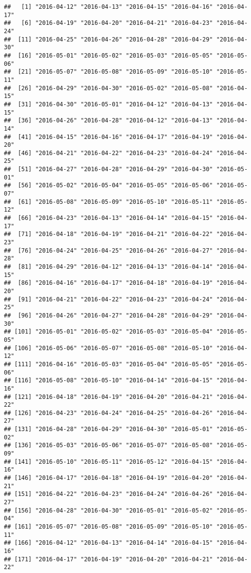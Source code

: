\documentclass[
]{article}
\begin{document}
\begin{verbatim}
##   [1] "2016-04-12" "2016-04-13" "2016-04-15" "2016-04-16" "2016-04-17"
##   [6] "2016-04-19" "2016-04-20" "2016-04-21" "2016-04-23" "2016-04-24"
##  [11] "2016-04-25" "2016-04-26" "2016-04-28" "2016-04-29" "2016-04-30"
##  [16] "2016-05-01" "2016-05-02" "2016-05-03" "2016-05-05" "2016-05-06"
##  [21] "2016-05-07" "2016-05-08" "2016-05-09" "2016-05-10" "2016-05-11"
##  [26] "2016-04-29" "2016-04-30" "2016-05-02" "2016-05-08" "2016-04-15"
##  [31] "2016-04-30" "2016-05-01" "2016-04-12" "2016-04-13" "2016-04-15"
##  [36] "2016-04-26" "2016-04-28" "2016-04-12" "2016-04-13" "2016-04-14"
##  [41] "2016-04-15" "2016-04-16" "2016-04-17" "2016-04-19" "2016-04-20"
##  [46] "2016-04-21" "2016-04-22" "2016-04-23" "2016-04-24" "2016-04-25"
##  [51] "2016-04-27" "2016-04-28" "2016-04-29" "2016-04-30" "2016-05-01"
##  [56] "2016-05-02" "2016-05-04" "2016-05-05" "2016-05-06" "2016-05-07"
##  [61] "2016-05-08" "2016-05-09" "2016-05-10" "2016-05-11" "2016-05-12"
##  [66] "2016-04-23" "2016-04-13" "2016-04-14" "2016-04-15" "2016-04-17"
##  [71] "2016-04-18" "2016-04-19" "2016-04-21" "2016-04-22" "2016-04-23"
##  [76] "2016-04-24" "2016-04-25" "2016-04-26" "2016-04-27" "2016-04-28"
##  [81] "2016-04-29" "2016-04-12" "2016-04-13" "2016-04-14" "2016-04-15"
##  [86] "2016-04-16" "2016-04-17" "2016-04-18" "2016-04-19" "2016-04-20"
##  [91] "2016-04-21" "2016-04-22" "2016-04-23" "2016-04-24" "2016-04-25"
##  [96] "2016-04-26" "2016-04-27" "2016-04-28" "2016-04-29" "2016-04-30"
## [101] "2016-05-01" "2016-05-02" "2016-05-03" "2016-05-04" "2016-05-05"
## [106] "2016-05-06" "2016-05-07" "2016-05-08" "2016-05-10" "2016-04-12"
## [111] "2016-04-16" "2016-05-03" "2016-05-04" "2016-05-05" "2016-05-06"
## [116] "2016-05-08" "2016-05-10" "2016-04-14" "2016-04-15" "2016-04-16"
## [121] "2016-04-18" "2016-04-19" "2016-04-20" "2016-04-21" "2016-04-22"
## [126] "2016-04-23" "2016-04-24" "2016-04-25" "2016-04-26" "2016-04-27"
## [131] "2016-04-28" "2016-04-29" "2016-04-30" "2016-05-01" "2016-05-02"
## [136] "2016-05-03" "2016-05-06" "2016-05-07" "2016-05-08" "2016-05-09"
## [141] "2016-05-10" "2016-05-11" "2016-05-12" "2016-04-15" "2016-04-16"
## [146] "2016-04-17" "2016-04-18" "2016-04-19" "2016-04-20" "2016-04-21"
## [151] "2016-04-22" "2016-04-23" "2016-04-24" "2016-04-26" "2016-04-27"
## [156] "2016-04-28" "2016-04-30" "2016-05-01" "2016-05-02" "2016-05-04"
## [161] "2016-05-07" "2016-05-08" "2016-05-09" "2016-05-10" "2016-05-11"
## [166] "2016-04-12" "2016-04-13" "2016-04-14" "2016-04-15" "2016-04-16"
## [171] "2016-04-17" "2016-04-19" "2016-04-20" "2016-04-21" "2016-04-22"

\end{verbatim}
\end{document}

